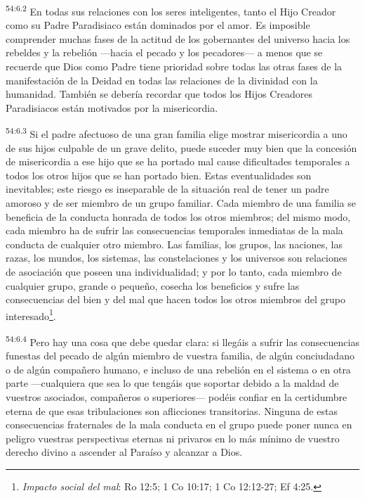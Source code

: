 \par
\textsuperscript{54:6.2} En todas sus relaciones con los seres inteligentes, tanto el Hijo Creador como su Padre Paradisiaco están dominados por el amor. Es imposible comprender muchas fases de la actitud de los gobernantes del universo hacia los rebeldes y la rebelión ---hacia el pecado y los pecadores--- a menos que se recuerde que Dios como Padre tiene prioridad sobre todas las otras fases de la manifestación de la Deidad en todas las relaciones de la divinidad con la humanidad. También se debería recordar que todos los Hijos Creadores Paradisiacos están motivados por la misericordia.

\par
\textsuperscript{54:6.3} Si el padre afectuoso de una gran familia elige mostrar misericordia a uno de sus hijos culpable de un grave delito, puede suceder muy bien que la concesión de misericordia a ese hijo que se ha portado mal cause dificultades temporales a todos los otros hijos que se han portado bien. Estas eventualidades son inevitables; este riesgo es inseparable de la situación real de tener un padre amoroso y de ser miembro de un grupo familiar. Cada miembro de una familia se beneficia de la conducta honrada de todos los otros miembros; del mismo modo, cada miembro ha de sufrir las consecuencias temporales inmediatas de la mala conducta de cualquier otro miembro. Las familias, los grupos, las naciones, las razas, los mundos, los sistemas, las constelaciones y los universos son relaciones de asociación que poseen una individualidad; y por lo tanto, cada miembro de cualquier grupo, grande o pequeño, cosecha los beneficios y sufre las consecuencias del bien y del mal que hacen todos los otros miembros del grupo interesado\footnote{\textit{Impacto social del mal}: Ro 12:5; 1 Co 10:17; 1 Co 12:12-27; Ef 4:25.}.

\par
\textsuperscript{54:6.4} Pero hay una cosa que debe quedar clara: si llegáis a sufrir las consecuencias funestas del pecado de algún miembro de vuestra familia, de algún conciudadano o de algún compañero humano, e incluso de una rebelión en el sistema o en otra parte ---cualquiera que sea lo que tengáis que soportar debido a la maldad de vuestros asociados, compañeros o superiores--- podéis confiar en la certidumbre eterna de que esas tribulaciones son aflicciones transitorias. Ninguna de estas consecuencias fraternales de la mala conducta en el grupo puede poner nunca en peligro vuestras perspectivas eternas ni privaros en lo más mínimo de vuestro derecho divino a ascender al Paraíso y alcanzar a Dios.

